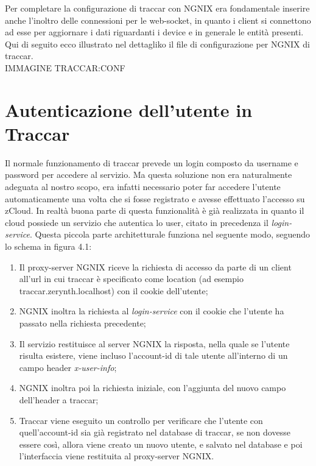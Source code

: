 \documentclass[a4paper,titlepage,12pt]{book}
\begin{document}
Per completare la configurazione di traccar con NGNIX era fondamentale inserire anche l'inoltro delle connessioni per le web-socket, in quanto i client si connettono ad esse per aggiornare i dati riguardanti i device e in generale le entità presenti. Qui di seguito ecco illustrato nel dettagliko il file di configurazione per NGNIX di traccar.\\
IMMAGINE TRACCAR:CONF\\

\section{\sffamily
Autenticazione dell'utente in Traccar}
Il normale funzionamento di traccar prevede un login composto da username e password per accedere al servizio. Ma questa soluzione non era naturalmente adeguata al nostro scopo, era infatti necessario poter far accedere l'utente automaticamente una volta che si fosse registrato e avesse effettuato l'accesso su zCloud. In realtà buona parte di questa funzionalità è già realizzata in quanto il cloud possiede un servizio che autentica lo user, citato in precedenza il \textit{login-service}. Questa piccola parte architetturale funziona nel seguente modo, seguendo lo schema in figura 4.1:\\
\begin{enumerate}
\item Il proxy-server NGNIX riceve la richiesta di accesso da parte di un client all'url in cui traccar è specificato come location (ad esempio traccar.zerynth.localhost) con il cookie dell'utente;
\item NGNIX inoltra la richiesta al \textit{login-service} con il cookie che l'utente ha passato nella richiesta precedente;
\item Il servizio restituisce al server NGNIX la risposta, nella quale se l'utente risulta esistere, viene incluso l'account-id di tale utente all'interno di un campo header \textit{x-user-info};
\item NGNIX inoltra poi la richiesta iniziale, con l'aggiunta del nuovo campo dell'header a traccar;

\item Traccar viene eseguito un controllo per verificare che l'utente con quell'account-id sia già registrato nel database di traccar, se non dovesse essere così, allora viene creato un nuovo utente, e salvato nel database e poi l'interfaccia viene restituita al proxy-server NGNIX.
\end{enumerate}
\end{document}

